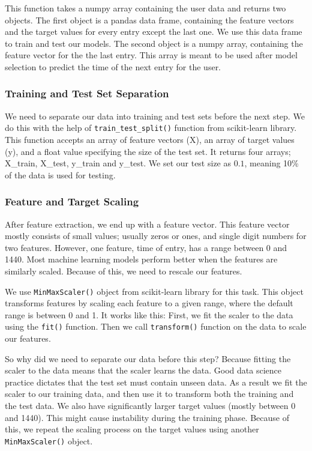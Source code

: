 \newpage
This function takes a numpy array containing the user data and returns two objects.
The first object is a pandas data frame, containing the feature vectors and the target values for every entry except the last one.
We use this data frame to train and test our models.
The second object is a numpy array, containing the feature vector for the the last entry.
This array is meant to be used after model selection to predict the time of the next entry for the user.

\subsubsection{Training and Test Set Separation}
We need to separate our data into training and test sets before the next step.
We do this with the help of \texttt{train\_test\_split()} function from scikit-learn library.
This function accepts an array of feature vectors (X), an array of target values (y), and a float value specifying the size of the test set.
It returns four arrays; X\_train, X\_test, y\_train and y\_test.
We set our test size as $0.1$, meaning 10\% of the data is used for testing.

\subsubsection{Feature and Target Scaling}
After feature extraction, we end up with a feature vector.
This feature vector mostly consists of small values; usually zeros or ones, and single digit numbers for two features.
However, one feature, time of entry, has a range between 0 and 1440.
Most machine learning models perform better when the features are similarly scaled.
Because of this, we need to rescale our features.

We use \texttt{MinMaxScaler()} object from scikit-learn library for this task.
This object transforms features by scaling each feature to a given range, where the default range is between 0 and 1.
It works like this: First, we fit the scaler to the data using the \texttt{fit()} function.
Then we call \texttt{transform()} function on the data to scale our features.

So why did we need to separate our data before this step?
Because fitting the scaler to the data means that the scaler learns the data.
Good data science practice dictates that the test set must contain unseen data.
As a result we fit the scaler to our training data, and then use it to transform both the training and the test data.
We also have significantly larger target values (mostly between 0 and 1440).
This might cause instability during the training phase.
Because of this, we repeat the scaling process on the target values using another \texttt{MinMaxScaler()} object.

